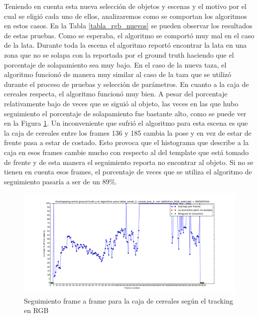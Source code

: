 Teniendo en cuenta esta nueva selección de objetos y escenas y el motivo por el cual se eligió cada uno de ellos, analizaremos como se comportan los algoritmos en estos casos. En la Tabla \ref{tabla_rgb_nuevos} se pueden observar los resultados de estas pruebas. Como se esperaba, el algoritmo se comportó muy mal en el caso de la lata. Durante toda la escena el algoritmo reportó encontrar la lata en una zona que no se solapa con la reportada por el ground truth haciendo que el porcentaje de solapamiento sea muy bajo. En el caso de la nueva taza, el algoritmo funcionó de manera muy similar al caso de la taza que se utilizó durante el proceso de pruebas y selección de parámetros. En cuanto a la caja de cereales respecta, el algoritmo funcionó muy bien. A pesar del porcentaje relativamente bajo de veces que se siguió al objeto, las veces en las que hubo seguimiento el porcentaje de solapamiento fue bastante alto, como se puede ver en la Figura \ref{frame_frame_rgb_nuevo}. Un inconveniente que sufrió el algoritmo para esta escena es que la caja de cereales entre los frames 136 y 185 cambia la pose y en vez de estar de frente pasa a estar de costado. Esto provoca que el histograma que describe a la caja en esos frames cambie mucho con respecto al del template que está tomado de frente y de esta manera el seguimiento reporta no encontrar al objeto. Si no se tienen en cuenta esos frames, el porcentaje de veces que se utiliza el algoritmo de seguimiento pasaría a ser de un 89\%.

\begin{figure}
	\centering
	\includegraphics[width=\textwidth]{img/seguimientoframeaframe-rgb-nuevo-caja.png}
	\caption{Seguimiento frame a frame para la caja de cereales según el tracking en RGB}
	\label{frame_frame_rgb_nuevo}
\end{figure}



